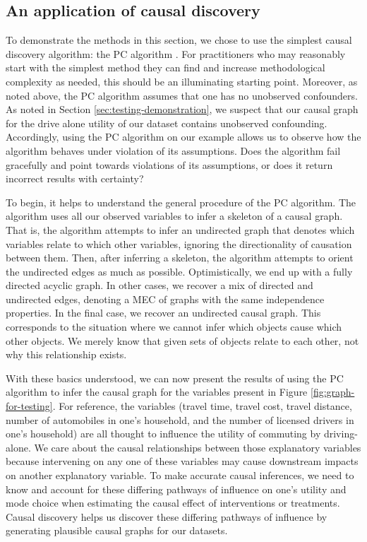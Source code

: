 \subsection{An application of causal discovery}
\label{sec:discovery-application}
To demonstrate the methods in this section, we chose to use the simplest causal discovery algorithm: the PC algorithm \citep{glymour_2001_causation}.
For practitioners who may reasonably start with the simplest method they can find and increase methodological complexity as needed, this should be an illuminating starting point.
Moreover, as noted above, the PC algorithm assumes that one has no unobserved confounders.
As noted in Section \ref{sec:testing-demonstration}, we suspect that our causal graph for the drive alone utility of our dataset contains unobserved confounding.
Accordingly, using the PC algorithm on our example allows us to observe how the algorithm behaves under violation of its assumptions.
Does the algorithm fail gracefully and point towards violations of its assumptions, or does it return incorrect results with certainty?

To begin, it helps to understand the general procedure of the PC algorithm. The algorithm uses all our observed variables to infer a skeleton of a causal graph.
That is, the algorithm attempts to infer an undirected graph that denotes which variables relate to which other variables, ignoring the directionality of causation between them.
Then, after inferring a skeleton, the algorithm attempts to orient the undirected edges as much as possible.
Optimistically, we end up with a fully directed acyclic graph.
In other cases, we recover a mix of directed and undirected edges, denoting a MEC of graphs with the same independence properties.
In the final case, we recover an undirected causal graph.
This corresponds to the situation where we cannot infer which objects cause which other objects.
We merely know that given sets of objects relate to each other, not why this relationship exists.

With these basics understood, we can now present the results of using the PC algorithm to infer the causal graph for the variables present in Figure \ref{fig:graph-for-testing}.
For reference, the variables (travel time, travel cost, travel distance, number of automobiles in one's household, and the number of licensed drivers in one's household) are all thought to influence the utility of commuting by driving-alone.
We care about the causal relationships between those explanatory variables because intervening on any one of these variables may cause downstream impacts on another explanatory variable.
To make accurate causal inferences, we need to know and account for these differing pathways of influence on one's utility and mode choice when estimating the causal effect of interventions or treatments.
Causal discovery helps us discover these differing pathways of influence by generating plausible causal graphs for our datasets.

